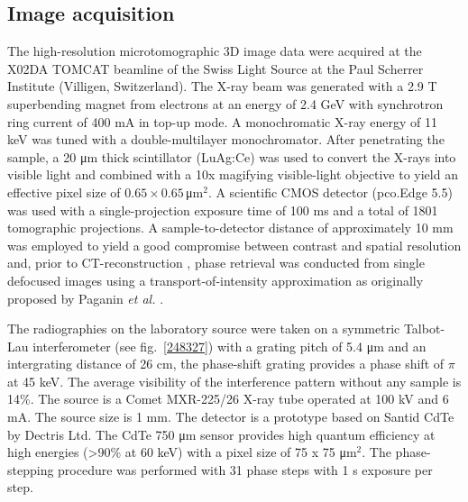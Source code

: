 \subsection{Image acquisition}\label{sec:acquisition}
The high-resolution microtomographic 3D image data were acquired at the X02DA TOMCAT beamline of the Swiss Light Source at the Paul Scherrer Institute (Villigen, Switzerland). The X-ray beam was generated with a 2.9 T superbending magnet from electrons at an energy of 2.4 GeV with synchrotron ring current of 400 mA in top-up mode. A monochromatic X-ray energy of 11 keV was tuned with a double-multilayer monochromator. After penetrating the sample, a 20 μm thick scintillator (LuAg:Ce) was used to convert the X-rays into visible light and combined with a 10x magifying visible-light objective to yield an effective pixel size of $0.65 \times 0.65\,$μm$^2$. A scientific CMOS detector (pco.Edge 5.5) was used with a single-projection exposure time of 100 ms and a total of 1801 tomographic projections. A sample-to-detector distance of approximately 10 mm was employed to yield a good compromise between contrast and spatial resolution and, prior to CT-reconstruction \cite{Marone2012}, phase retrieval was conducted from single defocused images using a transport-of-intensity approximation as originally proposed by Paganin \textit{et al.} \cite{Paganin2002}. 

The radiographies on the laboratory source were taken on a symmetric
Talbot-Lau interferometer (see fig.~\ref{248327}) with a grating pitch of 5.4 μm and an intergrating
distance of 26 cm, the phase-shift grating provides a phase shift of $\pi$
at 45 keV. The average visibility of the interference pattern without any
sample is 14\%. The source is a Comet MXR-225/26 X-ray tube operated at 100
kV and 6 mA. The source size is 1 mm. The detector is a prototype based on
Santid CdTe by Dectris Ltd. The CdTe 750 μm sensor provides high quantum
efficiency at high energies (>90\% at 60 keV) with a pixel size of 75 x 75
μm$^2$. The phase-stepping procedure was performed with 31 phase steps with
1 s exposure per step.
